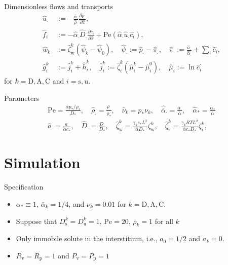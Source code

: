 \documentclass{beamer}
\begin{document}
\begin{frame}{Dimensionless flows and transports}
    \begin{align}
        \hat{u}_\cdot &:= -\frac{\hat{\alpha}_\cdot}{\hat{\rho}_\cdot}\frac{\partial \hat{p}_\cdot}{\partial \hat{x}},\\
        \hat{f}_i^\cdot &:= -{\hat{\alpha}_\cdot}\hat{D}_\cdot \frac{\partial \hat{c}_i^\cdot}{\partial \hat{x}} + \mathrm{Pe}(\hat{\alpha}_\cdot\hat{u}_\cdot\hat{c}_i^\cdot),\\
        \hat{w}_k&:= \hat{\zeta}_\mathrm{w}^k\left( \hat{\psi}_k-\hat{\psi}_0 \right),\quad\hat{\psi}_\cdot := \hat{p}_\cdot - \hat{\pi}_.,\quad \hat{\pi}_\cdot := \frac{\hat{a}_\cdot}{\hat{\alpha}_\cdot}+\sum_i \hat{c}_i^\cdot,\\
        \hat{g}_i^k &:= \hat{j}_i^k+\hat{h}_i^k,\quad \hat{j}_i^k :=\hat{\zeta}_i^k(\hat{\mu}_i^k-\hat{\mu}_i^0),\quad \hat{\mu}_i^\cdot:=\ln \hat{c}_i^\cdot\label{eq:nd_lasteq}
    \end{align}
        for $k=\mathrm{D},\mathrm{A},\mathrm{C}$ and $i=\mathrm{s},\mathrm{u}$.
\end{frame}

\begin{frame}{Parameters}
    \begin{gather}
        \mathrm{Pe} = \frac{\bar{\alpha}p_*/\rho_*}{D_*},\quad \hat{\rho}_\cdot = \frac{\rho_\cdot}{\rho_*},\quad \hat{\nu}_k = p_*\nu_k,\quad \hat{\bar{\alpha}}_\cdot = \frac{\bar{\alpha}_\cdot}{\bar{\alpha}},\quad \hat{\alpha}_* = \frac{\alpha_*}{\bar{\alpha}}\\
        \hat{a}_\cdot = \frac{a_\cdot}{\bar{\alpha}c_*},\quad
        \hat{D}_\cdot = \frac{D_\cdot}{D_*},\quad \hat{\zeta}_\mathrm{w}^k = \frac{\gamma_k c_*L^2}{\bar{\alpha}D_*}\zeta_\mathrm{w}^k,\quad\hat{\zeta}_i^k = \frac{\gamma_kRT L^2}{\bar{\alpha}c_* D_*}\zeta_i^k,
    \end{gather}
\end{frame}

\section{Simulation}

\begin{frame}{Specification}
    \begin{itemize}
        \item $\alpha_* \equiv 1$, $\bar{\alpha}_k = 1/4$, and $\nu_k = 0.01$ for $k=\mathrm{D},\mathrm{A},\mathrm{C}$.
        \item Suppose that $D_\mathrm{s}^k = D_{\mathrm{u}}^k = 1$, $\mathrm{Pe} = 20$, $\rho_k = 1$ for all $k$
        \item Only immobile solute in the interstitium, i.e., $a_0 = 1/2$ and $a_k = 0$.
        \item $R_\mathrm{v} = R_\mathrm{p} = 1$ and $P_\mathrm{v} = P_\mathrm{p} = 1$
    \end{itemize}
\end{frame}
\end{document}
